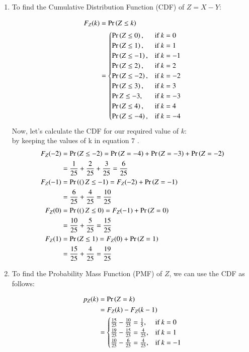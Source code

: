 \documentclass[journal,10pt,twocolumn]{IEEEtran}
\begin{document}
\begin{enumerate}
  \item To find the Cumulative Distribution Function (CDF) of $Z = X - Y$:
  
  \begin{align}
  F_Z(k) &= \Pr\left(Z \leq k\right) \\
  &= \begin{cases}
  \Pr\left(Z \leq 0\right), & \text{if } k = 0 \\
  \Pr\left(Z \leq 1\right), & \text{if } k = 1 \\
  \Pr\left(Z \leq -1\right), & \text{if } k = -1 \\
   \Pr\left(Z \leq 2\right), & \text{if } k = 2 \\
  \Pr\left(Z \leq -2\right), & \text{if } k = -2 \\
  \Pr\left(Z \leq 3\right), & \text{if } k = 3\\
   \Pr{Z \leq -3}, & \text{if } k = -3 \\
  \Pr\left(Z \leq 4\right), & \text{if } k = 4 \\
  \Pr\left(Z \leq -4\right), & \text{if } k = -4 \\
  \end{cases}
  \end{align}
  Now, let's calculate the CDF for our required value of $k$:\\  
  by keeping the values of k in equation $7$ .
  \begin{align}  
F_{Z}(-2) &= \Pr\left(Z \leq -2\right) = \Pr\left(Z = -4\right) + \Pr\left(Z = -3\right) +\Pr\left(Z = -2\right) \\
&=\frac{1}{25}+\frac{2}{25}+\frac{3}{25}=\frac{6}{25}  \\
F_{Z}(-1) &= \Pr\left((\right)Z \leq -1) = F_{Z}(-2) +\Pr\left(Z=-1\right)\\
&=\frac{6}{25}+\frac{4}{25}=\frac{10}{25}\\
F_{Z}(0) &= \Pr\left((\right)Z \leq 0) = F_{Z}(-1) +\Pr\left(Z=0\right)\\
&=\frac{10}{25}+\frac{5}{25}=\frac{15}{25}\\
F_{Z}(1) &= \Pr\left(Z \leq 1\right) = F_{Z}(0) +\Pr\left(Z=1\right)\\
&=\frac{15}{25}+\frac{4}{25}=\frac{19}{25}\\
\end{align}
  \item To find the Probability Mass Function (PMF) of $Z$, we can use the CDF as follows:
  
  \begin{align}
  p_Z(k) &= \Pr\left(Z = k\right) \\
  &= F_Z(k) - F_Z(k-1) \\
  &= \begin{cases}
  \frac{15}{25} -\frac{10}{25}=\frac{1}{5}, & \text{if } k = 0 \\
  \frac{19}{25} - \frac{15}{25}=\frac{4}{25}, & \text{if } k = 1 \\
  \frac{10}{25} - \frac{6}{25}=\frac{4}{25}, & \text{if } k = -1 \\
  \end{cases} \\
 \end{align}  
\end{enumerate}
\end{document}
